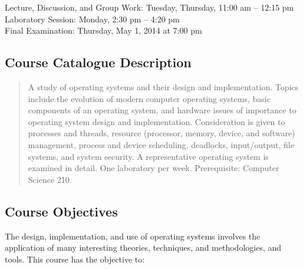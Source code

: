 Lecture, Discussion, and Group Work: Tuesday, Thursday, 11:00 am -- 12:15 pm\\
Laboratory Session: Monday, 2:30 pm -- 4:20 pm \\
Final Examination: Thursday, May 1, 2014 at 7:00 pm

\subsection*{Course Catalogue Description}

\begin{quote}

A study of operating systems and their design and implementation. Topics include the evolution of modern computer
operating systems, basic components of an operating system, and hardware issues of importance to operating system design
and implementation. Consideration is given to processes and threads, resource (processor, memory, device, and software)
management, process and device scheduling, deadlocks, input/output, file systems, and system security. A representative
operating system is examined in detail. One laboratory per week. Prerequisite: Computer Science 210. 

\end{quote}

\subsection*{Course Objectives}

The design, implementation, and use of operating systems involves the application of many interesting
theories, techniques, and methodologies, and tools.  This course has the objective to: 

